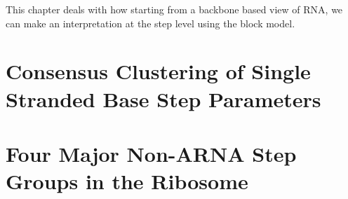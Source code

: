 This chapter deals with how starting from a backbone based view of
RNA, we can make an interpretation at the step level using the block model.
\section{Consensus Clustering of Single Stranded Base Step Parameters}

\section{Four Major Non-ARNA Step Groups in the Ribosome}



